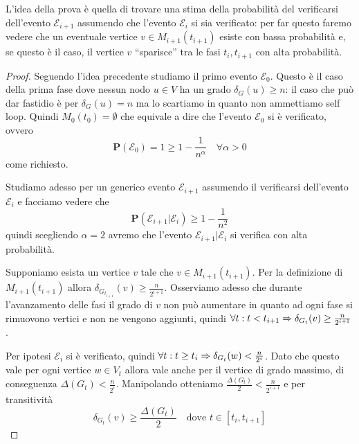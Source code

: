 \documentclass{article}
\begin{document}
    L'idea della prova \`e quella di trovare una stima della probabilit\`a 
    del verificarsi dell'evento $\mathcal{E}_{i+1}$ assumendo che l'evento 
    $\mathcal{E}_{i}$ si sia verificato: per far questo faremo vedere che
    un eventuale vertice $v \in M_{i+1}(t_{i+1})$ esiste con bassa
    probabilit\`a e, se questo \`e il caso, il vertice $v$ ``sparisce''
    tra le fasi $t_i, t_{i+1}$ con alta probabilit\`a.

\begin{proof}
    Seguendo l'idea precedente studiamo il primo evento $\mathcal{E}_0$. Questo 
    \`e il caso della prima fase dove nessun nodo $u \in V$ ha un grado 
    $\delta_G(u) \geq n$: il caso che pu\`o dar fastidio \`e per
    $\delta_G(u) = n$ ma lo scartiamo in quanto non ammettiamo self loop. 
    Quindi $M_0(t_0) = \emptyset$ che equivale a dire
    che l'evento $\mathcal{E}_0$ si \`e verificato, ovvero 
    \begin{displaymath}
        \mathbf{P} (\mathcal{E}_0) = 1 \geq 1 - \frac{1}{n^\alpha} \quad
        \forall \alpha > 0
    \end{displaymath}    
     come richiesto.

    Studiamo adesso per un generico evento $\mathcal{E}_{i+1}$ assumendo il
    verificarsi dell'evento $\mathcal{E}_{i}$ e facciamo vedere che
    \begin{displaymath}
        \mathbf{P}(\mathcal{E}_{i+1} | \mathcal{E}_{i}) \geq 1 - \frac{1}{n^2}
    \end{displaymath}
    quindi scegliendo $\alpha = 2$ avremo che l'evento 
    $\mathcal{E}_{i+1} | \mathcal{E}_{i}$ si verifica con alta probabilit\`a.

    Supponiamo esista un vertice $v$ tale che $v \in M_{i+1}(t_{i+1})$. Per
    la definizione di $M_{i+1}(t_{i+1})$ allora $\delta_{G_{t_{i+1}}}(v) 
    \geq \frac{n}{2^{i+1}}$. Osserviamo adesso che durante l'avanzamento delle
    fasi il grado di $v$ non pu\`o aumentare in quanto ad ogni fase si 
    rimuovono vertici e non ne vengono aggiunti, quindi $\forall t: 
    t < t_{i+1} \Rightarrow \delta_{G_{t}}(v) \geq \frac{n}{2^{i+1}}$.

    Per ipotesi $\mathcal{E}_i$ si \`e verificato, quindi $\forall t: 
    t \geq t_i \Rightarrow \delta_{G_{t}}(w) < \frac{n}{2^i}$.
    Dato che questo vale per ogni vertice $w \in V_t$ allora vale anche 
    per il vertice di grado massimo, di conseguenza 
    $\Delta(G_{t}) < \frac{n}{2^i}$. Manipolando otteniamo
    $\frac{\Delta(G_{t})}{2} < \frac{n}{2^{i+1}}$ e per transitivit\`a 
    \begin{displaymath}
        \delta_{G_t}(v) \geq \frac{\Delta(G_{t})}{2} \quad \text{dove } 
        t \in [t_i,t_{i+1}]
    \end{displaymath}


\end{proof}
\end{document}
